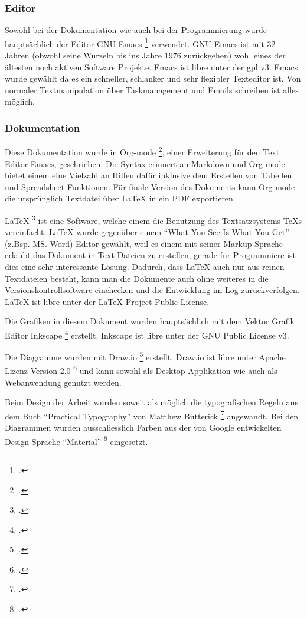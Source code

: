 \subsubsection{Editor}
\label{sec:orge9cf706}

Sowohl bei der Dokumentation wie auch bei der Programmierung wurde
hauptsächlich der Editor GNU Emacs \footcite{emacs} verwendet. GNU Emacs ist mit
32 Jahren (obwohl seine Wurzeln bis ins Jahre 1976 zurückgehen) wohl eines der
ältesten noch aktiven Software Projekte. Emacs ist \gls{libre} unter der
\gls{gpl} v3. Emacs wurde gewählt da es ein schneller, schlanker und sehr
flexibler Texteditor ist. Von normaler Textmanipulation über Taskmanagement
und Emails schreiben ist alles möglich.

\subsubsection{Dokumentation}
\label{sec:org84f7d80}

Diese Dokumentation wurde in Org-mode \footcite{orgmode}, einer Erweiterung für
den Text Editor Emacs, geschrieben. Die Syntax erinnert an Markdown und
Org-mode bietet einem eine Vielzahl an Hilfen dafür inklusive dem Erstellen von
Tabellen und Spreadsheet Funktionen. Für finale Version des Dokuments kann
Org-mode die ursprünglich Textdatei über \LaTeX{} in ein PDF exportieren.

\LaTeX{} \footcite{latex} ist eine Software, welche einem die Benutzung des
Textsatzsystems TeXs vereinfacht. \LaTeX{} wurde gegenüber einem "`What You See Is
What You Get"' (z.Bsp. MS. Word) Editor gewählt, weil es einem mit seiner Markup
Sprache erlaubt das Dokument in Text Dateien zu erstellen, gerade für
Programmiere ist dies eine sehr interessante Lösung. Dadurch, dass \LaTeX{} auch
nur aus reinen Textdateien besteht, kann man die Dokumente auch ohne weiteres
in die Versionskontrollsoftware einchecken und die Entwicklung im Log
zurückverfolgen. \LaTeX{} ist \gls{libre} unter der \LaTeX{} Project Public
License.

Die Grafiken in diesem Dokument wurden hauptsächlich mit dem Vektor Grafik
Editor Inkscape \footcite{inkscape} erstellt. Inkscape ist \gls{libre} unter der
GNU Public License v3.

Die Diagramme wurden mit Draw.io \footcite{draw} erstellt. Draw.io ist \gls{libre}
unter Apache Lizenz Version 2.0 \footcite{apache} und kann sowohl als Desktop
Applikation wie auch als Webanwendung genutzt werden.

Beim Design der Arbeit wurden soweit als möglich die typografischen Regeln aus
dem Buch "`Practical Typography"' von Matthew Butterick \footcite{typo} angewandt.
Bei den Diagrammen wurden ausschliesslich Farben aus der von Google
entwickelten Design Sprache "`Material"' \footcite{material} eingesetzt.


